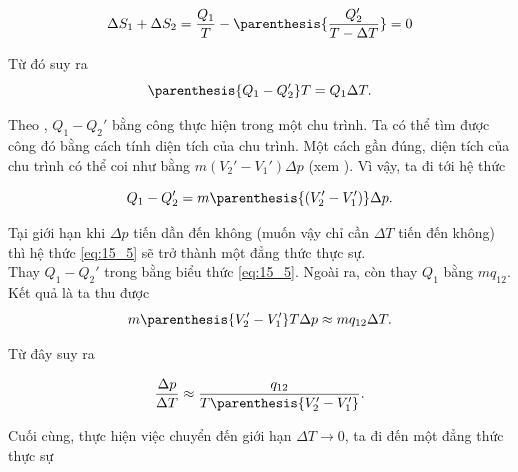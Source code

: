 \begin{equation*}
    \Delta S_1 + \Delta S_2 = \frac{Q_1}{T} - \parenthesis{\frac{Q_2'}{T-\Delta T}} = 0
\end{equation*}

\noindent

Từ đó suy ra
\begin{equation}\label{eq:15_4}
    \parenthesis{Q_1 - Q_2'}T = Q_1 \Delta T.
\end{equation}

Theo , $Q_1-Q_2'$ bằng công thực hiện trong một chu trình. Ta có thể tìm được công đó bằng cách tính diện tích của chu trình. Một cách gần đúng, diện tích của chu trình có thể coi như bằng $m(V_2'-V_1')\Delta p$ (xem ). Vì vậy, ta đi tới hệ thức

\begin{equation}\label{eq:15_5}
    Q_1 - Q_2' = m\parenthesis{(V_2'-V_1')}\Delta p.
\end{equation}

\noindent
Tại giới hạn khi $\Delta p$ tiến dần đến không (muốn vậy chỉ cần $\Delta T$ tiến đến không) thì hệ thức \eqref{eq:15_5} sẽ trở thành một đẳng thức thực sự.\\

Thay $Q_1-Q_2'$ trong   bằng biểu thức \eqref{eq:15_5}. Ngoài ra, còn thay $Q_1$ bằng $mq_{12}$. Kết quả là ta thu được
\begin{equation*}
    m\parenthesis{V_2'-V_1'} T \Delta p \approx mq_{12} \Delta T.
\end{equation*}

\noindent
Từ đây suy ra

\begin{equation*}
    \frac{\Delta p}{\Delta T} \approx \frac{q_{12}}{T\parenthesis{V_2'-V_1'}}.
\end{equation*}

\noindent
Cuối cùng, thực hiện việc chuyển đến giới hạn $\Delta T\to 0$, ta đi đến một đẳng thức thực sự

